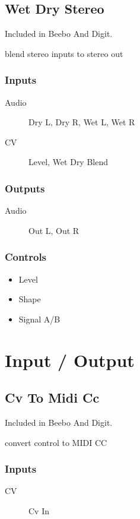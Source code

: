 \subsection{Wet Dry Stereo}

Included in Beebo And Digit.

blend stereo inputs to stereo out



\subsubsection{Inputs}
\begin{description}
\item [Audio] Dry L, Dry R, Wet L, Wet R
\item [CV] Level, Wet Dry Blend
\end{description}

\subsubsection{Outputs}
\begin{description}
\item [Audio] Out L, Out R
\end{description}

\subsubsection{Controls}
\begin{itemize}
\item Level
\item Shape
\item Signal A/B
\end{itemize}

\section{Input / Output}

\subsection{Cv To Midi Cc}

Included in Beebo And Digit.

convert control to MIDI CC



\subsubsection{Inputs}
\begin{description}
\item [CV] Cv In
\end{description}

